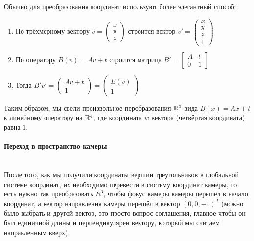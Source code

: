 \documentclass{article}
\begin{document}
Обычно для преобразования координат используют более элегантный способ:
\begin{enumerate} 
	\item По трёхмерному вектору $v=\begin{pmatrix}
x \\ y \\ z
\end{pmatrix}$ строится вектор $v'=\begin{pmatrix}
x \\ y \\ z \\ 1
\end{pmatrix}$
	\item По оператору $B(v)=Av+t$ строится матрица $B' = \begin{bmatrix}
	A & t \\
	0 & 1
	\end{bmatrix}$
	\item Тогда $B'v' = \begin{pmatrix}
	Av + t \\
	1
	\end{pmatrix} = \begin{pmatrix}
	B(v) \\
	1
	\end{pmatrix}$
\end{enumerate}

Таким образом, мы свели произвольное перобразования $\mathbb{R}^3$ вида $B(x)=Ax+t$ к линейному оператору на $\mathbb{R}^4$, где координата $w$ вектора (четвёртая координата) равна $1$.

\pagebreak

\paragraph{Переход в пространство камеры}
$\text{}$\\
После того, как мы получили координаты вершин треугольников в глобальной системе координат, их необходимо перевести в систему координат камеры, то есть нужно так преобразовать $R^3$, чтобы фокус камеры камеры перешёл в начало координат, а вектор направления камеры перешёл в вектор $(0, 0, -1)^T$ (можно было выбрать и другой вектор, это просто вопрос соглашения, главное чтобы он был единичной длины и перпендикулярен вектору, который мы считаем направленным вверх). 
\end{document}
